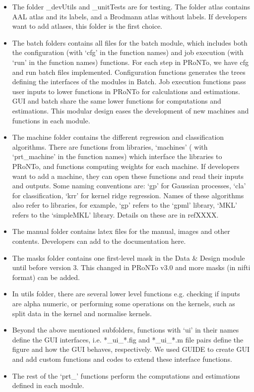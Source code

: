 \begin{itemize}
\item The folder \_devUtils and \_unitTests are for testing. The folder atlas contains AAL atlas and its labels, and a Brodmann atlas without labels. If developers want to add atlases, this folder is the first choice.
 
\item The batch folders contains all files for the batch module, which includes both the configuration (with `cfg' in the function names) and job execution (with `run' in the function names) functions. For each step in PRoNTo, we have cfg and run batch files implemented. Configuration functions generates the trees defining the interfaces of the modules in Batch. Job execution functions pass user inputs to lower functions in PRoNTo for calculations and estimations. GUI and batch share the same lower functions for computations and estimations. This modular design eases the development of new machines and functions in each module. 

\item The machine folder contains the different regression and classification algorithms. There are functions from libraries, `machines' ( with `prt\_machine' in the function names) which interface the libraries to PRoNTo, and functions computing weights for each machine.  If developers want to add a machine, they can open these functions and read their inputs and outputs. Some naming conventions are: `gp' for Gaussian processes, `cla' for classification, `krr' for kernel ridge regression. Names of these algorithms also refer to libraries, for example, `gp' refers to the `gpml' library, `MKL' refers to the `simpleMKL' library. Details on these are in ref{XXXX}.

\item The manual folder contains latex files for the manual, images and other contents. Developers can add to the documentation here.

\item The masks folder contains one first-level mask in the Data \& Design module until before version 3. This changed in PRoNTo v3.0 and more masks (in nifti format) can be added.

\item In utils folder, there are several lower level functions e.g. checking if inputs are alpha numeric, or performing some operations on the kernels, such as split data in the kernel and normalise kernels. 
 
\item Beyond the above mentioned subfolders, functions with `ui' in their names define the GUI interfaces, i.e. *\_ui\_*.fig and *\_ui\_*.m file pairs define the figure and how the GUI behaves, respectively. We used GUIDE to create GUI and add custom functions and codes to extend these interface functions. 
 
\item The rest of the `prt\_' functions perform the computations and estimations defined in each module. 

\end{itemize}

